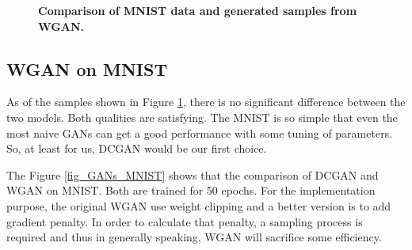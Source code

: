 \documentclass{article}
\newcommand{\mycaption}[2]{\caption[#1]{\textbf{#1.} #2}}
\begin{document}
\begin{figure}[!htb]
  \centering
  \mycaption{Comparison of MNIST data and generated samples from WGAN}{}
  \label{fig_MNIST}
\end{figure}

\subsection{WGAN on MNIST}
As of the samples shown in Figure \ref{fig_MNIST}, there is no significant difference between the two models. Both qualities are satisfying. The MNIST is so simple that even the most naive GANs can get a good performance with some tuning of parameters. So, at least for us, DCGAN would be our first choice. 

The Figure \ref{fig_GANs_MNIST} shows that the comparison of DCGAN and WGAN on MNIST. Both are trained for 50 epochs. For the implementation purpose, the original WGAN use weight clipping and a better version is to add gradient penalty. In order to calculate that penalty, a sampling process is required and thus in generally speaking, WGAN will sacrifice some efficiency. 
\end{document}
